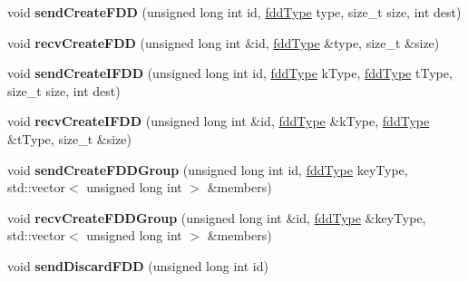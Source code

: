 \begin{DoxyCompactItemize}
void {\bfseries send\+Create\+F\+DD} (unsigned long int id, \hyperlink{namespacefaster_aa8898687bc64536b60a3d5f365060cd6}{fdd\+Type} type, size\+\_\+t size, int dest)
\item 
\hypertarget{classfaster_1_1fastComm_a6335e73103253b835208bbb3b15a318a}{}\label{classfaster_1_1fastComm_a6335e73103253b835208bbb3b15a318a} 
void {\bfseries recv\+Create\+F\+DD} (unsigned long int \&id, \hyperlink{namespacefaster_aa8898687bc64536b60a3d5f365060cd6}{fdd\+Type} \&type, size\+\_\+t \&size)
\item 
\hypertarget{classfaster_1_1fastComm_a1b714530bd2e7c2e0c6a65480bdf5dcf}{}\label{classfaster_1_1fastComm_a1b714530bd2e7c2e0c6a65480bdf5dcf} 
void {\bfseries send\+Create\+I\+F\+DD} (unsigned long int id, \hyperlink{namespacefaster_aa8898687bc64536b60a3d5f365060cd6}{fdd\+Type} k\+Type, \hyperlink{namespacefaster_aa8898687bc64536b60a3d5f365060cd6}{fdd\+Type} t\+Type, size\+\_\+t size, int dest)
\item 
\hypertarget{classfaster_1_1fastComm_a81974b476357e1d465268d58b14de068}{}\label{classfaster_1_1fastComm_a81974b476357e1d465268d58b14de068} 
void {\bfseries recv\+Create\+I\+F\+DD} (unsigned long int \&id, \hyperlink{namespacefaster_aa8898687bc64536b60a3d5f365060cd6}{fdd\+Type} \&k\+Type, \hyperlink{namespacefaster_aa8898687bc64536b60a3d5f365060cd6}{fdd\+Type} \&t\+Type, size\+\_\+t \&size)
\item 
\hypertarget{classfaster_1_1fastComm_a66d4d60b7222f81167428594a26d1138}{}\label{classfaster_1_1fastComm_a66d4d60b7222f81167428594a26d1138} 
void {\bfseries send\+Create\+F\+D\+D\+Group} (unsigned long int id, \hyperlink{namespacefaster_aa8898687bc64536b60a3d5f365060cd6}{fdd\+Type} key\+Type, std\+::vector$<$ unsigned long int $>$ \&members)
\item 
\hypertarget{classfaster_1_1fastComm_a7c04292c7b224a00fbe414e6d22d4bf4}{}\label{classfaster_1_1fastComm_a7c04292c7b224a00fbe414e6d22d4bf4} 
void {\bfseries recv\+Create\+F\+D\+D\+Group} (unsigned long int \&id, \hyperlink{namespacefaster_aa8898687bc64536b60a3d5f365060cd6}{fdd\+Type} \&key\+Type, std\+::vector$<$ unsigned long int $>$ \&members)
\item 
\hypertarget{classfaster_1_1fastComm_a7e1ca7788c4310cb84640812fa50a012}{}\label{classfaster_1_1fastComm_a7e1ca7788c4310cb84640812fa50a012} 
void {\bfseries send\+Discard\+F\+DD} (unsigned long int id)
\item 
\hypertarget{classfaster_1_1fastComm_aaa0a11dcde70a8dcf39b0773c9c15d43}{}\label{classfaster_1_1fastComm_aaa0a11dcde70a8dcf39b0773c9c15d43} 

\end{DoxyCompactItemize}
